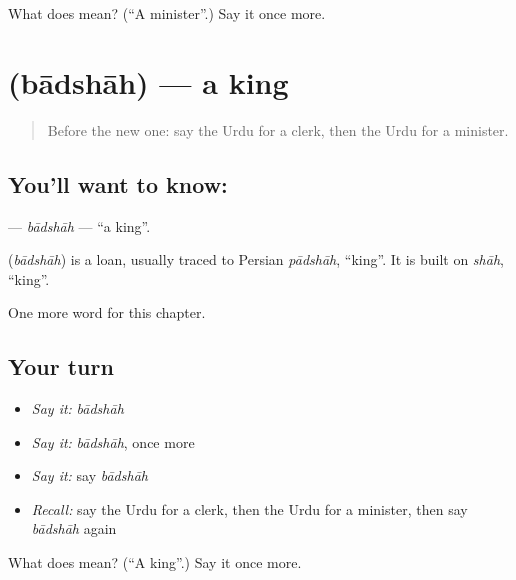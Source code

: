 \begin{tcolorbox}[breakable,colback=teal!4,colframe=teal!35!black,title={Before you move on}]
What does  mean? (\textquotedblleft{}A minister\textquotedblright{}.) Say it once more.
\end{tcolorbox}
\section[\texorpdfstring{\ur{بادشاہ} (bādshāh)}{بادشاہ (bādshāh)}]{ (bādshāh) — a king}

\label{lesson:UR-C179-badshah}



\begin{quote}
Before the new one: say the Urdu for a clerk, then the Urdu for a minister.
\end{quote}

\subsection*{You'll want to know: }
\textbf{} — \emph{bādshāh} — \textquotedblleft{}a king\textquotedblright{}.

\begin{cousinweb}
\textbf{} (\emph{bādshāh}) is a loan, usually traced to Persian \emph{pādshāh}, \textquotedblleft{}king\textquotedblright{}. It is built on \emph{shāh}, \textquotedblleft{}king\textquotedblright{}.
\end{cousinweb}

\begin{grammarlens}[title={What you've built}]
One more word for this chapter.
\end{grammarlens}

\subsection*{Your turn}
\begin{itemize}
\raggedright
  \item \emph{Say it:} \emph{bādshāh}
  \item \emph{Say it:} \emph{bādshāh}, once more
  \item \emph{Say it:} say \emph{bādshāh}
  \item \emph{Recall:} say the Urdu for a clerk, then the Urdu for a minister, then say \emph{bādshāh} again
\end{itemize}

\begin{tcolorbox}[breakable,colback=teal!4,colframe=teal!35!black,title={Before you move on}]
What does  mean? (\textquotedblleft{}A king\textquotedblright{}.) Say it once more.
\end{tcolorbox}
